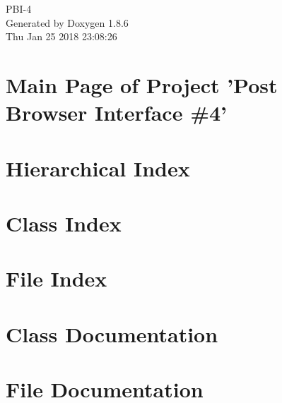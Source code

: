 \documentclass[twoside]{book}
\newcommand{\clearemptydoublepage}{%
  \newpage{\pagestyle{empty}\cleardoublepage}%
}
\begin{document}
\hypersetup{pageanchor=false}
\begin{titlepage}
\vspace*{7cm}
\begin{center}%
{\Large P\-B\-I-\/4 }\\
\vspace*{1cm}
{\large Generated by Doxygen 1.8.6}\\
\vspace*{0.5cm}
{\small Thu Jan 25 2018 23:08:26}\\
\end{center}
\end{titlepage}
\clearemptydoublepage
\tableofcontents
\clearemptydoublepage
{}
\hypersetup{pageanchor=true}

\chapter{Main Page of Project 'Post Browser Interface \#4'}
\label{index}\hypertarget{index}{}
\chapter{Hierarchical Index}

\chapter{Class Index}

\chapter{File Index}

\chapter{Class Documentation}

















\chapter{File Documentation}






































\newpage
{}
{}
\printindex
\end{document}

